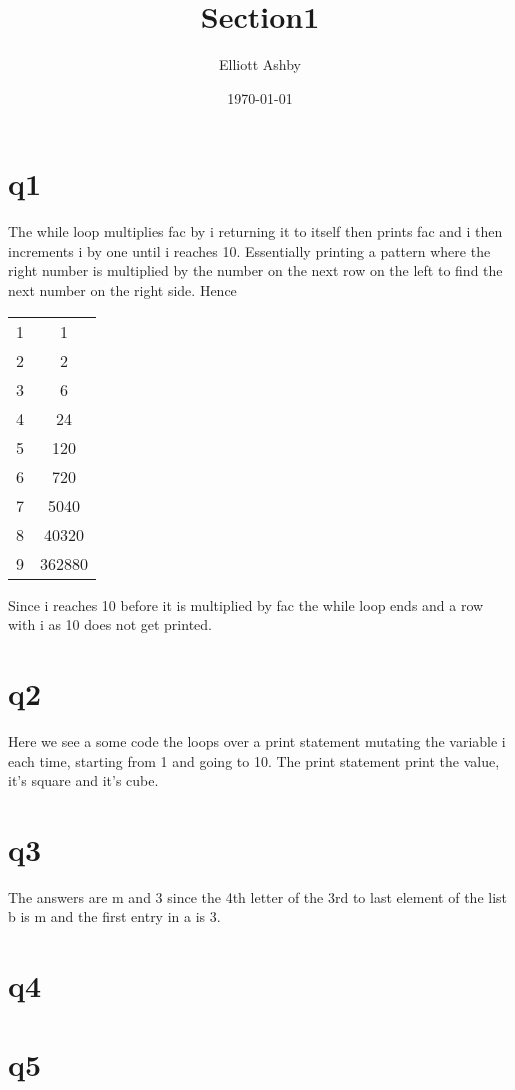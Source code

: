 \documentclass[a4paper,english]{article}
\title{Section1}
\author{Elliott Ashby}
\date{\today}
\begin{document}
    \maketitle
    \section{q1}
    The while loop multiplies fac by i returning it to itself then prints fac and i then increments
    i by one until i reaches 10. Essentially printing a pattern where the right number is multiplied by the 
    number on the next row on the left to find the next number on the right side. Hence \\
    \begin{center}
        \begin{tabular}{ |c|c| }
            1 & 1 \\
            2 & 2 \\
            3 & 6 \\
            4 & 24 \\
            5 & 120 \\
            6 & 720 \\
            7 & 5040 \\
            8 & 40320 \\
            9 & 362880
        \end{tabular}
    \end{center}
    Since i reaches 10 before it is multiplied by fac the while loop ends and a row with i as 10 does not get printed.
    \section{q2}
    
    Here we see a some code the loops over a print statement mutating the variable i each time, starting from 1 and going to 10.
    The print statement print the value, it's square and it's cube.
    \section{q3}
    The answers are m and 3 since the 4th letter of the 3rd to last element of the list b is m and the first entry in a is 3.
    \section{q4} 
    
    \section{q5}
    
\end{document}
